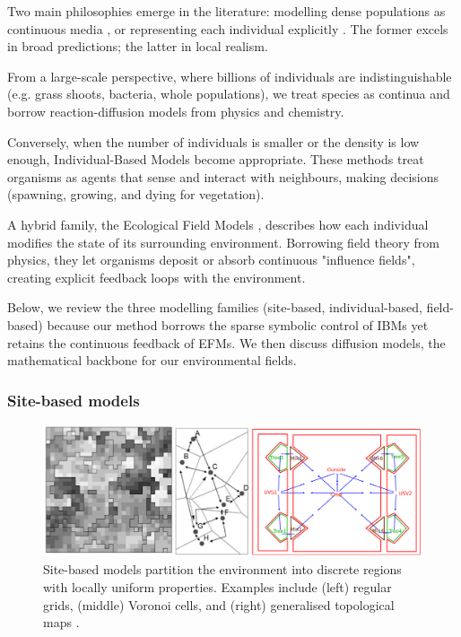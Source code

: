 Two main philosophies emerge in the literature: modelling dense populations as continuous media \cite{Turing1952}, or representing each individual explicitly \cite{Czaran1998}. The former excels in broad predictions; the latter in local realism.

From a large-scale perspective, where billions of individuals are indistinguishable (e.g. grass shoots, bacteria, whole populations), we treat species as continua and borrow reaction-diffusion models from physics and chemistry.

Conversely, when the number of individuals is smaller or the density is low enough, Individual-Based Models become appropriate. These methods treat organisms as agents that sense and interact with neighbours, making decisions (spawning, growing, and dying for vegetation).

A hybrid family, the Ecological Field Models \cite{Wu1985}, describes how each individual modifies the state of its surrounding environment. Borrowing field theory from physics, they let organisms deposit or absorb continuous "influence fields", creating explicit feedback loops with the environment.

Below, we review the three modelling families (site-based, individual-based, field-based) because our method borrows the sparse symbolic control of IBMs yet retains the continuous feedback of EFMs. We then discuss diffusion models, the mathematical backbone for our environmental fields.

\subsubsection{Site-based models}

\begin{figure}[H]
\centering
\includegraphics[width=.8\linewidth]{grid-based-modeling-teaser.png}
\caption{Site-based models partition the environment into discrete regions with locally uniform properties. Examples include (left) regular grids, (middle) Voronoi cells, and (right) generalised topological maps \cite{Nelson2012,Lemiere2023}.}
\label{fig:env-obj-grid-based-models}
\end{figure}

